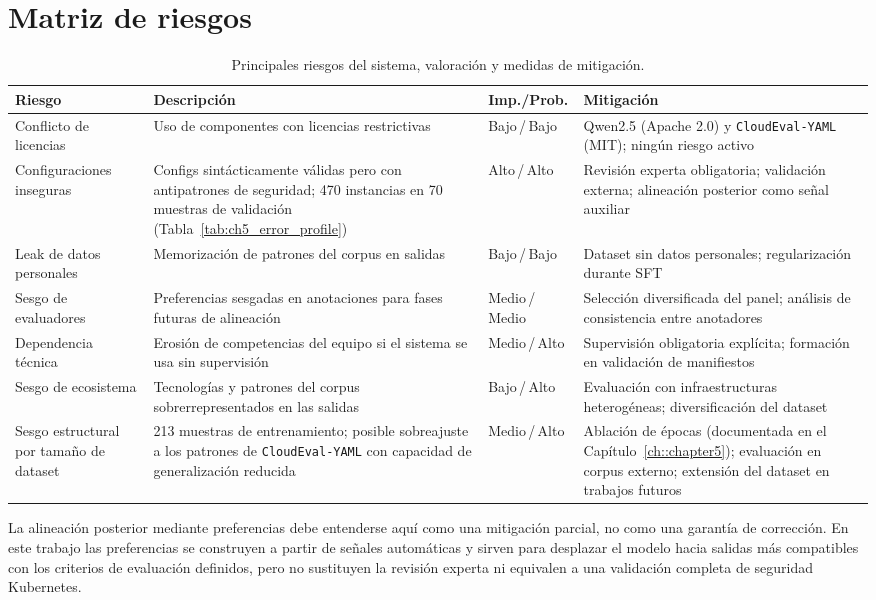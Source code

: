 \section{Matriz de riesgos}

\begin{table}[htbp]
\centering
\caption{Principales riesgos del sistema, valoración y medidas de mitigación.}
\label{tab:ch8_risk_table}
\begin{tabular}{p{}p{}p{}p{}}
\toprule
\textbf{Riesgo} & \textbf{Descripción} & \textbf{Imp./Prob.} & \textbf{Mitigación} \\
\midrule
Conflicto de licencias &
    Uso de componentes con licencias restrictivas &
    Bajo\,/\,Bajo &
    Qwen2.5 (Apache 2.0) y \texttt{CloudEval-YAML} (MIT); ningún riesgo activo \\
Configuraciones inseguras &
    Configs sintácticamente válidas pero con antipatrones de seguridad; 470 instancias en 70 muestras de validación (Tabla~\ref{tab:ch5_error_profile}) &
    Alto\,/\,Alto &
    Revisión experta obligatoria; validación externa; alineación posterior como señal auxiliar \\
Leak de datos personales &
    Memorización de patrones del corpus en salidas &
    Bajo\,/\,Bajo &
    Dataset sin datos personales; regularización durante SFT \\
Sesgo de evaluadores &
    Preferencias sesgadas en anotaciones para fases futuras de alineación &
    Medio\,/\,Medio &
    Selección diversificada del panel; análisis de consistencia entre anotadores \\
Dependencia técnica &
    Erosión de competencias del equipo si el sistema se usa sin supervisión &
    Medio\,/\,Alto &
    Supervisión obligatoria explícita; formación en validación de manifiestos \\
Sesgo de ecosistema &
    Tecnologías y patrones del corpus sobrerrepresentados en las salidas &
    Bajo\,/\,Alto &
    Evaluación con infraestructuras heterogéneas; diversificación del dataset \\
Sesgo estructural por tamaño de dataset &
    213 muestras de entrenamiento; posible sobreajuste a los patrones de \texttt{CloudEval-YAML} con capacidad de generalización reducida &
    Medio\,/\,Alto &
    Ablación de épocas (documentada en el Capítulo~\ref{ch::chapter5}); evaluación en corpus externo; extensión del dataset en trabajos futuros \\
\bottomrule
\end{tabular}
\end{table}

La alineación posterior mediante preferencias debe entenderse aquí como una mitigación parcial, no como una garantía de corrección. En este trabajo las preferencias se construyen a
partir de señales automáticas y sirven para desplazar el modelo hacia salidas más compatibles con los criterios de evaluación definidos, pero no sustituyen la revisión experta ni
equivalen a una validación completa de seguridad Kubernetes.
